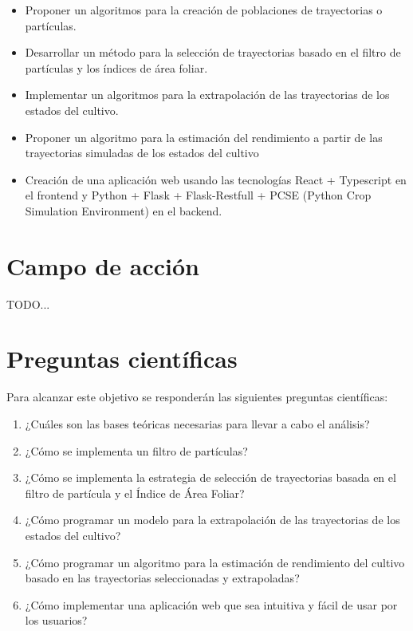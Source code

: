\begin{itemize}
	\item Proponer un algoritmos para la creación de poblaciones de trayectorias o partículas.
	\item Desarrollar un método para la selección de trayectorias basado en el filtro de partículas y los índices de área foliar.
	\item Implementar un algoritmos para la extrapolación de las trayectorias de los estados del cultivo.
	\item Proponer un algoritmo para la estimación del rendimiento a partir de las trayectorias simuladas de los estados del cultivo
	\item Creación de una aplicación web usando las tecnologías React + Typescript en el frontend y Python + Flask + Flask-Restfull + PCSE (Python Crop Simulation Environment) en el backend.
\end{itemize}

\section*{Campo de acción}
TODO...



\section*{Preguntas científicas}
Para alcanzar este objetivo se responderán las siguientes preguntas científicas:

\begin{enumerate}
	\item ¿Cuáles son las bases teóricas necesarias para llevar a cabo el análisis?
	\item ¿Cómo se implementa un filtro de partículas?
	\item ¿Cómo se implementa la estrategia de selección de trayectorias basada en el filtro de partícula y el Índice de Área Foliar?
	\item ¿Cómo programar un modelo para la extrapolación de las trayectorias de los estados del cultivo?
	\item ¿Cómo programar un algoritmo para la estimación de rendimiento del cultivo basado en las trayectorias seleccionadas y extrapoladas?
	\item ¿Cómo implementar una aplicación web que sea intuitiva y fácil de usar por los usuarios?
\end{enumerate}

